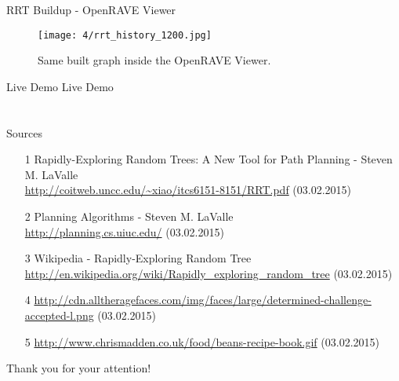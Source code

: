 \documentclass[%
  professionalfonts,%
  xcolor={%
    usenames,%
    dvipsnames,%
    svgnames,%
    table,%
    hyperref%
  }%
]{beamer}
\begin{document}
\begin{frame}{RRT Buildup - OpenRAVE Viewer}
	\begin{figure}[h]
		\centering
		\texttt{[image: 4/rrt\_history\_1200.jpg]}
		\caption{Same built graph inside the OpenRAVE Viewer.}
	\end{figure}
\end{frame}

\begin{frame}{Live Demo}
	\centering\Huge{Live Demo}
\end{frame}

\section{}
\begin{frame}{Sources}
	\begin{itemize}
		\item[1] Rapidly-Exploring Random Trees: A New Tool for Path Planning - Steven M. LaValle
		\\\url{http://coitweb.uncc.edu/~xiao/itcs6151-8151/RRT.pdf} (03.02.2015)
		\item[2] Planning Algorithms - Steven M. LaValle
		\\\url{http://planning.cs.uiuc.edu/} (03.02.2015)
		\item[3] Wikipedia - Rapidly-Exploring Random Tree
		\\\url{http://en.wikipedia.org/wiki/Rapidly_exploring_random_tree} (03.02.2015)
    \item[4] \url{http://cdn.alltheragefaces.com/img/faces/large/determined-challenge-accepted-l.png} (03.02.2015)
    \item[5] \url{http://www.chrismadden.co.uk/food/beans-recipe-book.gif} (03.02.2015)
	\end{itemize}
\end{frame}

\begin{frame}
	\centering\Huge{Thank you for your attention!}
\end{frame}
\end{document}
